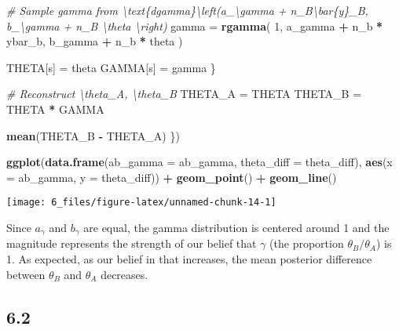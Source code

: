 \documentclass[]{article}
\newenvironment{Shaded}{\begin{snugshade}}{\end{snugshade}}
\newcommand{\CommentTok}[1]{\textcolor[rgb]{0.56,0.35,0.01}{\textit{#1}}}
\newcommand{\DataTypeTok}[1]{\textcolor[rgb]{0.13,0.29,0.53}{#1}}
\newcommand{\DecValTok}[1]{\textcolor[rgb]{0.00,0.00,0.81}{#1}}
\newcommand{\KeywordTok}[1]{\textcolor[rgb]{0.13,0.29,0.53}{\textbf{#1}}}
\newcommand{\NormalTok}[1]{#1}
\newcommand{\OperatorTok}[1]{\textcolor[rgb]{0.81,0.36,0.00}{\textbf{#1}}}
\newcommand{\StringTok}[1]{\textcolor[rgb]{0.31,0.60,0.02}{#1}}
\begin{document}
\begin{Shaded}
\begin{Highlighting}[]
    \CommentTok{# Sample gamma from \textbackslash{}text\{dgamma\}\textbackslash{}left(a_\textbackslash{}gamma + n_B\textbackslash{}bar\{y\}_B, b_\textbackslash{}gamma + n_B \textbackslash{}theta \textbackslash{}right)}
\NormalTok{    gamma =}\StringTok{ }\KeywordTok{rgamma}\NormalTok{(}
      \DecValTok{1}\NormalTok{,}
\NormalTok{      a_gamma }\OperatorTok{+}\StringTok{ }\NormalTok{n_b }\OperatorTok{*}\StringTok{ }\NormalTok{ybar_b,}
\NormalTok{      b_gamma }\OperatorTok{+}\StringTok{ }\NormalTok{n_b }\OperatorTok{*}\StringTok{ }\NormalTok{theta}
\NormalTok{    )}

\NormalTok{    THETA[s] =}\StringTok{ }\NormalTok{theta}
\NormalTok{    GAMMA[s] =}\StringTok{ }\NormalTok{gamma}
\NormalTok{  \}}

  \CommentTok{# Reconstruct \textbackslash{}theta_A, \textbackslash{}theta_B}
\NormalTok{  THETA_A =}\StringTok{ }\NormalTok{THETA}
\NormalTok{  THETA_B =}\StringTok{ }\NormalTok{THETA }\OperatorTok{*}\StringTok{ }\NormalTok{GAMMA}

  \KeywordTok{mean}\NormalTok{(THETA_B }\OperatorTok{-}\StringTok{ }\NormalTok{THETA_A)}
\NormalTok{\})}

\KeywordTok{ggplot}\NormalTok{(}\KeywordTok{data.frame}\NormalTok{(}\DataTypeTok{ab_gamma =}\NormalTok{ ab_gamma, }\DataTypeTok{theta_diff =}\NormalTok{ theta_diff), }\KeywordTok{aes}\NormalTok{(}\DataTypeTok{x =}\NormalTok{ ab_gamma, }\DataTypeTok{y =}\NormalTok{ theta_diff)) }\OperatorTok{+}
\StringTok{  }\KeywordTok{geom_point}\NormalTok{() }\OperatorTok{+}
\StringTok{  }\KeywordTok{geom_line}\NormalTok{()}
\end{Highlighting}
\end{Shaded}

\begin{center}\texttt{[image: 6\_files/figure-latex/unnamed-chunk-14-1]} \end{center}

Since \(a_\gamma\) and \(b_\gamma\) are equal, the gamma distribution is
centered around 1 and the magnitude represents the strength of our
belief that \(\gamma\) (the proportion \(\theta_B / \theta_A\)) is 1. As
expected, as our belief in that increases, the mean posterior difference
between \(\theta_B\) and \(\theta_A\) decreases.

\hypertarget{section-1}{%
\subsection{6.2}\label{section-1}}
\end{document}
